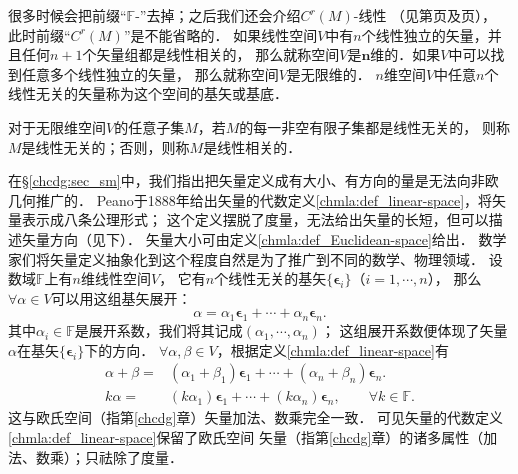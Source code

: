 很多时候会把前缀“$\mathbb{F}$-”去掉；之后我们还会介绍$C^r(M)$-线性
（见第\pageref{chdm:eqn_functimesv}页及\pageref{chdm:thm_Tensor-Characterization-Lemma}页），
此时前缀“$C^r(M)$”是不能省略的．
如果线性空间$V$中有$n$个线性独立的矢量，并且任何$n+1$个矢量组都是线性相关的，
那么就称空间$V$是$\boldsymbol{n}${\heiti 维}的．如果$V$中可以找到任意多个线性独立的矢量，
那么就称空间$V$是{\heiti 无限维}的．
$n$维空间$V$中任意$n$个线性无关的矢量称为这个空间的{\heiti 基矢}或{\heiti 基底}．

\begin{definition}
	对于无限维空间$V$的任意子集$M$，若$M$的每一非空有限子集都是线性无关的，
	则称$M$是线性无关的；否则，则称$M$是线性相关的．
\end{definition}




在\S\ref{chcdg:sec_sm}中，我们指出把矢量定义成有大小、有方向的量是无法向非欧几何推广的．
Peano于1888年给出{\kaishu 矢量}的代数定义\ref{chmla:def_linear-space}，将矢量表示成八条公理形式；
这个定义摆脱了度量，无法给出矢量的长短，但可以描述矢量方向（见下）．
矢量大小可由定义\ref{chmla:def_Euclidean-space}给出．
数学家们将矢量定义抽象化到这个程度自然是为了推广到不同的数学、物理领域．
设数域$\mathbb{F}$上有$n$维线性空间$V$，
它有$n$个线性无关的基矢$\{\boldsymbol{\epsilon}_i\}$（$i=1,\cdots,n$），
那么$\forall \alpha \in V$可以用这组基矢展开：
\begin{equation}
	\alpha = \alpha_1 \boldsymbol{\epsilon}_1 +\cdots +\alpha_n \boldsymbol{\epsilon}_n.
\end{equation}
其中$\alpha_i\in \mathbb{F}$是展开系数，我们将其记成$(\alpha_1,\cdots,\alpha_n)$；
这组展开系数便体现了矢量$\alpha$在基矢$\{\boldsymbol{\epsilon}_i\}$下的{\kaishu 方向}．
$\forall \alpha ,\beta \in V$，根据定义\ref{chmla:def_linear-space}有
\begin{align}
	\alpha + \beta =& (\alpha_1+\beta_1)\boldsymbol{\epsilon}_1 +\cdots+(\alpha_n+\beta_n)\boldsymbol{\epsilon}_n .\\
	k\alpha =& (k\alpha_1) \boldsymbol{\epsilon}_1 +\cdots +(k\alpha_n) \boldsymbol{\epsilon}_n, 
	\qquad \forall k\in \mathbb{F}.
\end{align}
这与欧氏空间（指第\ref{chcdg}章）矢量加法、数乘完全一致．
可见矢量的代数定义\ref{chmla:def_linear-space}保留了欧氏空间
矢量（指第\ref{chcdg}章）的诸多属性（加法、数乘）；只祛除了度量．


